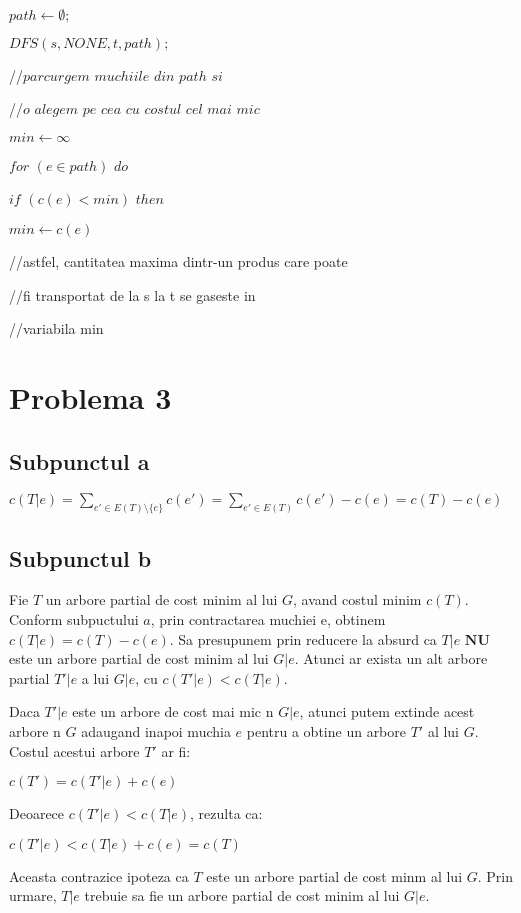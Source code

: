 \documentclass{article}
\begin{document}
{    \\
    \par $path \leftarrow \emptyset;$
    \par $DFS(s, NONE, t, path);$
    \\
    \par //$parcurgem$ $muchiile$ $din$ $path$ $si$ 
    \par //$o$ $alegem$ $pe$ $cea$ $cu$ $costul$ $cel$ $mai$ $mic$
    \par $min \leftarrow \infty$
    \par $for$  $(e\in path)$ $do$
    \par \hspace*{1cm} $if$ $(c(e)<min)$ $then$
    \par \hspace*{1.5cm} $min \leftarrow c(e)$
    \par //astfel, cantitatea maxima dintr-un produs care poate
    \par //fi transportat de la s la t se gaseste in 
    \par //variabila min 

}

\section*{\fontsize{20}{50}\selectfont Problema 3}
\subsection*{\fontsize{16}{30}\selectfont Subpunctul a}
{\fontsize{14}{16}\selectfont 

\centerline {$ c(T|e) = \sum_{ e'\in E(T)\setminus \lbrace e \rbrace } c(e') = \sum_{ e'\in E(T) } c(e') - c(e) = c(T) - c(e)$ }
}

\subsection*{\fontsize{16}{30}\selectfont Subpunctul b}
{\fontsize{14}{16}\selectfont 
    Fie $T$ un arbore partial de cost minim al lui $G$, avand costul minim $c(T)$. Conform subpuctului $a$, prin contractarea muchiei e, obtinem $c(T|e) = c(T) - c(e)$.
    Sa presupunem prin reducere la absurd ca $T|e$ $\mathbf{N} \mathbf{U}$ este un arbore partial de cost minim al lui $G|e$. Atunci ar exista un alt arbore partial $T'|e$ a lui $G|e$, cu $c(T'|e) < c(T|e)$.
    \par Daca $T'|e$ este un arbore de cost mai mic n $G|e$, atunci putem extinde acest arbore n $G$ adaugand inapoi muchia $e$ pentru a obtine un arbore $T'$ al lui $G$. Costul acestui arbore $T'$ ar fi:
    \par \centerline { $c(T') = c(T'|e) + c(e)$ }
    \par Deoarece $c(T'|e) < c(T|e)$, rezulta ca:
    \par \centerline {$c(T'|e) < c(T|e) + c(e) = c(T) $}
    \par Aceasta contrazice ipoteza ca $T$ este un arbore partial de cost minm al lui $G$. Prin urmare, $T|e$ trebuie sa fie un arbore partial de cost minim al lui $G|e$.
    }
\end{document}
